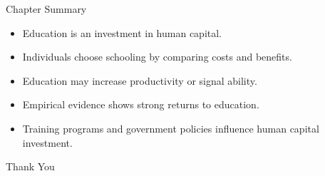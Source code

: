 \documentclass[aspectratio=169]{beamer}
\begin{document}
\begin{frame}{Chapter Summary}

\begin{itemize}
\item Education is an investment in human capital.
\item Individuals choose schooling by comparing costs and benefits.
\item Education may increase productivity or signal ability.
\item Empirical evidence shows strong returns to education.
\item Training programs and government policies influence human capital investment.
\end{itemize}

\end{frame}

\begin{frame}
\centering
\Huge Thank You
\end{frame}
\end{document}
